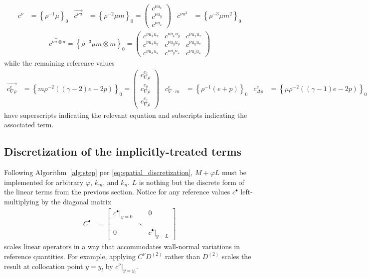 \documentclass[letterpaper,11pt,nointlimits,reqno,draft]{amsbook}
\newcommand{\reference}[1]{\ensuremath{\left\{#1\right\}_{0}}}
\begin{document}
\begin{align}
  c^{\nu} &= \reference{\rho^{-1}\mu}
&
  \overrightarrow{c^{\nu{}u}} &= \reference{\rho^{-2}\mu{}m}
  = \begin{pmatrix} c^{\nu{}u_x} \\ c^{\nu{}u_y} \\ c^{\nu{}u_z} \end{pmatrix}
&
  c^{\nu{}u^2} &= \reference{\rho^{-3}\mu{}m^2}
\end{align}
\begin{align}
   \overleftrightarrow{c^{\nu{}u\otimes{}u}}
  = \reference{\rho^{-3}\mu{}m\otimes{}m}
  = \begin{pmatrix}
   c^{\nu{} u_x u_x} & c^{\nu{} u_x u_y} & c^{\nu{} u_x u_z} \\
   c^{\nu{} u_x u_y} & c^{\nu{} u_y u_y} & c^{\nu{} u_y u_z} \\
   c^{\nu{} u_x u_z} & c^{\nu{} u_y u_z} & c^{\nu{} u_z u_z}
  \end{pmatrix}
\end{align}
while the remaining reference values
\begin{align}
  \overrightarrow{c^{e}_{\nabla\rho}} &= \reference{
        m\rho^{-2}\left(\left(\gamma-2\right)e-2p\right)
  }
  = \begin{pmatrix}
      c^{e_{x}}_{\nabla\rho} \\
      c^{e_{y}}_{\nabla\rho} \\
      c^{e_{z}}_{\nabla\rho}
  \end{pmatrix}
&
  c^{e}_{\nabla\cdot{}m} &= \reference{
        \rho^{-1}\left(e + p\right)
  }
&
  c^{e}_{\Delta\rho} &= \reference{
        \mu\rho^{-2}\left(\left(\gamma-1\right)e-2p\right)
  }
\end{align}
have superscripts indicating the relevant equation and
subscripts indicating the associated term.

\subsection{Discretization of the implicitly-treated terms}
\label{sec:discretizationofimplicitterms}
Following Algorithm~\ref{alg:step} per \eqref{eq:spatial_discretization},
$M+\varphi{}L$ must be implemented for arbitrary $\varphi$, $k_m$, and $k_n$.
$L$ is nothing but the discrete form of the linear terms from the previous
section.  Notice for any reference values $c^{\bullet}$ left-multiplying by
the diagonal matrix
\begin{align}
  C^{\bullet} &= \begin{bmatrix}
   \left.c^{\bullet}\right|_{y=0} &        & 0 \\
                                  & \ddots &    \\
   0                              &        & \left.c^{\bullet}\right|_{y=L}
   \end{bmatrix}
\end{align}
scales linear operators in a way that accommodates wall-normal variations in
reference quantities.  For example, applying $C^{\nu}D^{(2)}$ rather than
$D^{(2)}$ scales the result at collocation point $y=y_l$ by
$\left.c^{\nu}\right|_{y=y_l}$.
\end{document}
